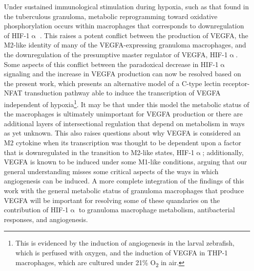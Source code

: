 Under sustained immunological stimulation during hypoxia, such as that found in the tuberculous granuloma, metabolic reprogramming toward oxidative phosphorylation occurs within macrophages that corresponds to downregulation of HIF-1$\upalpha$ \citep{Wilson2019, Mehrotra2014}. This raises a potent conflict between the production of VEGFA, the M2-like identity of many of the VEGFA-expressing granuloma macrophages, and the downregulation of the presumptive master regulator of VEGFA, HIF-1$\upalpha$. Some aspects of this conflict between the paradoxical decrease in HIF-1$\upalpha$ signaling and the increase in VEGFA production can now be resolved based on the present work, which presents an alternative model of a C-type lectin receptor-NFAT transduction pathway able to induce the transcription of VEGFA independent of hypoxia\footnote{This is evidenced by the induction of angiogenesis in the larval zebrafish, which is perfused with oxygen, and the induction of VEGFA in THP-1 macrophages, which are cultured under 21\% O\textsubscript{2} in air.}. It may be that under this model the metabolic status of the macrophages is ultimately unimportant for VEGFA production or there are additional layers of intersectional regulation that depend on metabolism in ways as yet unknown. This also raises questions about why VEGFA is considered an M2 cytokine when its transcription was thought to be dependent upon a factor that is downregulated in the transition to M2-like states, HIF-1$\upalpha$; additionally, VEGFA is known to be induced under some M1-like conditions, arguing that our general understanding misses some critical aspects of the ways in which angiogenesis can be induced. A more complete integration of the findings of this work with the general metabolic status of granuloma macrophages that produce VEGFA will be important for resolving some of these quandaries on the contribution of HIF-1$\upalpha$ to granuloma macrophage metabolism, antibacterial responses, and angiogenesis.

